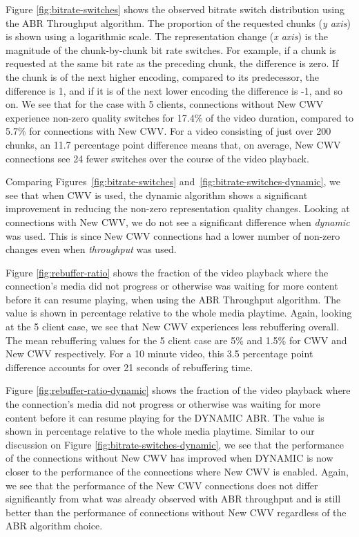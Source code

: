 \documentclass[10pt,sigconf]{acmart}
\begin{document}
Figure \ref{fig:bitrate-switches} shows the observed bitrate switch distribution using the ABR Throughput algorithm. The proportion of the requested chunks (\emph{y axis}) is shown using a logarithmic scale. The representation change (\emph{x axis}) is the magnitude of the chunk-by-chunk bit rate switches. For example, if a chunk is requested at the same bit rate as the preceding chunk, the difference is zero. If the chunk is of the next higher encoding, compared to its predecessor, the difference is 1, and if it is of the next lower encoding the difference is -1, and so on. We see that for the case with 5 clients, connections without New CWV experience non-zero quality switches for 17.4\% of the video duration, compared to 5.7\% for connections with New CWV. For a video consisting of just over 200 chunks, an 11.7 percentage point difference means that, on average, New CWV connections see 24 fewer switches over the course of the video playback.


Comparing Figures~\ref{fig:bitrate-switches} and~\ref{fig:bitrate-switches-dynamic}, we see that when CWV is used, the dynamic algorithm shows a significant improvement in reducing the non-zero representation quality changes. Looking at connections with New CWV, we do not see a significant difference when \emph{dynamic} was used. This is since New CWV connections had a lower number of non-zero changes even when \emph{throughput} was used.  

Figure \ref{fig:rebuffer-ratio} shows the fraction of the video playback where the connection's media did not progress or otherwise was waiting for more content before it can resume playing, when using the ABR Throughput algorithm. The value is shown in percentage relative to the whole media playtime. Again, looking at the 5 client case, we see that New CWV experiences less rebuffering overall. The mean rebuffering values for the 5 client case are 5\% and 1.5\% for CWV and New CWV respectively. For a 10 minute video, this 3.5 percentage point difference accounts for over 21 seconds of rebuffering time.

Figure \ref{fig:rebuffer-ratio-dynamic} shows the fraction of the video playback where the connection's media did not progress or otherwise was waiting for more content before it can resume playing for the DYNAMIC ABR. The value is shown in percentage relative to the whole media playtime. Similar to our discussion on Figure \ref{fig:bitrate-switches-dynamic}, we see that the performance of the connections without New CWV has improved when DYNAMIC is now closer to the performance of the connections where New CWV is enabled. Again, we see that the performance of the New CWV connections does not differ significantly from what was already observed with ABR throughput and is still better than the performance of connections without New CWV regardless of the ABR algorithm choice.
\end{document}
